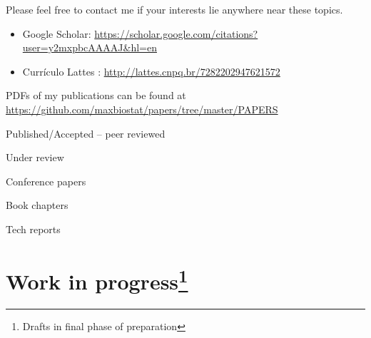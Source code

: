 \documentclass[10pt]{article}
\begin{document}
Please feel free to contact me if your interests lie anywhere near these topics.

\begin{itemize}
 \item[] Google Scholar: \url{https://scholar.google.com/citations?user=y2mxpbcAAAAJ&hl=en}\\
 \item[] Curr\'iculo Lattes : \url{ http://lattes.cnpq.br/7282202947621572} 
\end{itemize}

\newpage
PDFs of my publications can be found at \url{https://github.com/maxbiostat/papers/tree/master/PAPERS}
\nocite{*}
\begin{category}{Published/Accepted -- peer reviewed}
\end{category}

\begin{category}{Under review}
\end{category}

\begin{category}{Conference papers}
\end{category}

\begin{category}{Book chapters}
\end{category}

\begin{category}{Tech reports}
\end{category}




\section*{Work in progress\footnote{Drafts in final phase of preparation}}
\end{document}
